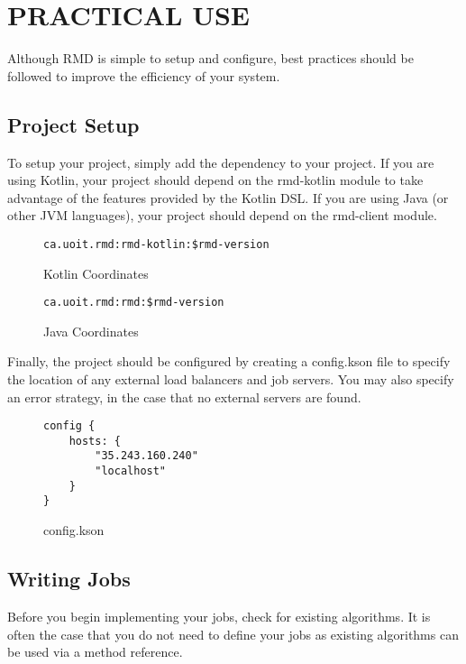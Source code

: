 \section{PRACTICAL USE}\label{sec:practicalUse}

Although RMD is simple to setup and configure,
best practices should be followed to improve the
efficiency of your system.


\subsection{Project Setup}\label{subsec:projectSetup}

To setup your project, simply add the dependency to your
project.
If you are using Kotlin, your project should depend
on the rmd-kotlin module to take advantage of
the features provided by the Kotlin DSL.
If you are using Java (or other JVM languages), your project
should depend on the rmd-client module.

\begin{figure}[H]
\caption{Kotlin Coordinates}
    \begin{lstlisting}
ca.uoit.rmd:rmd-kotlin:$rmd-version
    \end{lstlisting}
\end{figure}

\begin{figure}[H]
    \caption{Java Coordinates}
    \begin{lstlisting}
ca.uoit.rmd:rmd:$rmd-version
    \end{lstlisting}
\end{figure}

Finally, the project should be configured by creating
a config.kson file to specify the location of any
external load balancers and job servers. You may also specify
an error strategy, in the case that no external servers are found.

\begin{figure}[H]
\caption{config.kson}
    \begin{lstlisting}
config {
    hosts: {
        "35.243.160.240"
        "localhost"
    }
}
    \end{lstlisting}
\end{figure}

\subsection{Writing Jobs}\label{subsec:writingJobs}
Before you begin implementing your jobs, check for
existing algorithms.
It is often the case that you do not need to define
your jobs as existing algorithms can be used via a method reference.

